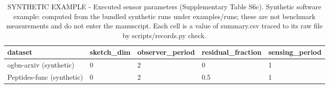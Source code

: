 \begin{table}[t]
\centering
\small
\caption{SYNTHETIC EXAMPLE - Executed sensor parameters (Supplementary Table S6c). Synthetic software example: computed from the bundled synthetic runs under examples/runs; these are not benchmark measurements and do not enter the manuscript. Each cell is a value of summary.csv traced to its raw file by scripts/records.py check.}
\label{tab:records-sensor_parameters}
\begin{tabular}{lllll}
\hline
dataset & sketch\_dim & observer\_period & residual\_fraction & sensing\_period \\
\hline
ogbn-arxiv (synthetic) & 0 & 2 & 0 & 1 \\
Peptides-func (synthetic) & 0 & 2 & 0.5 & 1 \\
\hline
\end{tabular}
\end{table}
